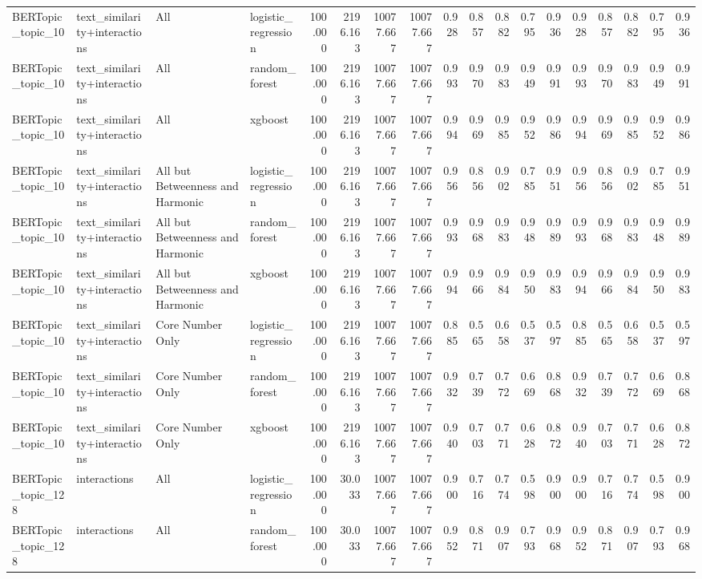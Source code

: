 \begin{tabular}{llllrrrrrrrrrrrrrr}
BERTopic_topic_10 & text_similarity+interactions & All & logistic_regression & 100.000 & 2196.163 & 10077.667 & 10077.667 & 0.928 & 0.857 & 0.882 & 0.795 & 0.936 & 0.928 & 0.857 & 0.882 & 0.795 & 0.936 \\
BERTopic_topic_10 & text_similarity+interactions & All & random_forest & 100.000 & 2196.163 & 10077.667 & 10077.667 & 0.993 & 0.970 & 0.983 & 0.949 & 0.991 & 0.993 & 0.970 & 0.983 & 0.949 & 0.991 \\
BERTopic_topic_10 & text_similarity+interactions & All & xgboost & 100.000 & 2196.163 & 10077.667 & 10077.667 & 0.994 & 0.969 & 0.985 & 0.952 & 0.986 & 0.994 & 0.969 & 0.985 & 0.952 & 0.986 \\
BERTopic_topic_10 & text_similarity+interactions & All but Betweenness and Harmonic & logistic_regression & 100.000 & 2196.163 & 10077.667 & 10077.667 & 0.956 & 0.856 & 0.902 & 0.785 & 0.951 & 0.956 & 0.856 & 0.902 & 0.785 & 0.951 \\
BERTopic_topic_10 & text_similarity+interactions & All but Betweenness and Harmonic & random_forest & 100.000 & 2196.163 & 10077.667 & 10077.667 & 0.993 & 0.968 & 0.983 & 0.948 & 0.989 & 0.993 & 0.968 & 0.983 & 0.948 & 0.989 \\
BERTopic_topic_10 & text_similarity+interactions & All but Betweenness and Harmonic & xgboost & 100.000 & 2196.163 & 10077.667 & 10077.667 & 0.994 & 0.966 & 0.984 & 0.950 & 0.983 & 0.994 & 0.966 & 0.984 & 0.950 & 0.983 \\
BERTopic_topic_10 & text_similarity+interactions & Core Number Only & logistic_regression & 100.000 & 2196.163 & 10077.667 & 10077.667 & 0.885 & 0.565 & 0.658 & 0.537 & 0.597 & 0.885 & 0.565 & 0.658 & 0.537 & 0.597 \\
BERTopic_topic_10 & text_similarity+interactions & Core Number Only & random_forest & 100.000 & 2196.163 & 10077.667 & 10077.667 & 0.932 & 0.739 & 0.772 & 0.669 & 0.868 & 0.932 & 0.739 & 0.772 & 0.669 & 0.868 \\
BERTopic_topic_10 & text_similarity+interactions & Core Number Only & xgboost & 100.000 & 2196.163 & 10077.667 & 10077.667 & 0.940 & 0.703 & 0.771 & 0.628 & 0.872 & 0.940 & 0.703 & 0.771 & 0.628 & 0.872 \\
BERTopic_topic_128 & interactions & All & logistic_regression & 100.000 & 30.033 & 10077.667 & 10077.667 & 0.900 & 0.716 & 0.774 & 0.598 & 0.900 & 0.900 & 0.716 & 0.774 & 0.598 & 0.900 \\
BERTopic_topic_128 & interactions & All & random_forest & 100.000 & 30.033 & 10077.667 & 10077.667 & 0.952 & 0.871 & 0.907 & 0.793 & 0.968 & 0.952 & 0.871 & 0.907 & 0.793 & 0.968 \\

\end{tabular}
